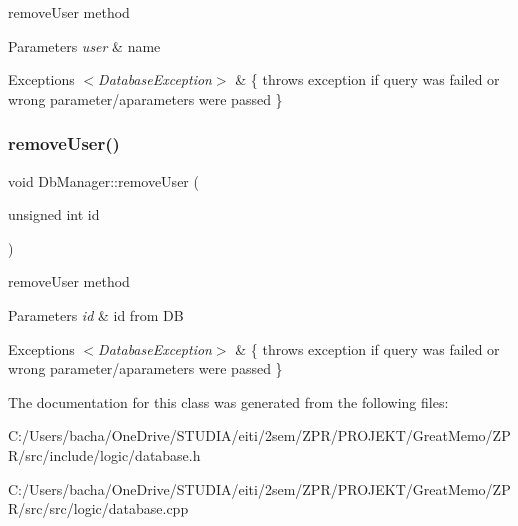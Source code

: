 remove\+User method 


\begin{DoxyParams}{Parameters}
{\em user} & name \\
\hline
\end{DoxyParams}

\begin{DoxyExceptions}{Exceptions}
{\em $<$\+Database\+Exception$>$} & \{ throws exception if query was failed or wrong parameter/aparameters were passed \} \\
\hline
\end{DoxyExceptions}
\mbox{\label{class_db_manager_ae9a11e4d2d53c2e4f63a835c43f2bab8}} 
\subsubsection{\texorpdfstring{remove\+User()}{removeUser()}\hspace{0.1cm}{\footnotesize\ttfamily [2/2]}}
{\footnotesize\ttfamily void Db\+Manager\+::remove\+User (\begin{DoxyParamCaption}\item[{unsigned int}]{id }\end{DoxyParamCaption})}



remove\+User method 


\begin{DoxyParams}{Parameters}
{\em id} & id from DB \\
\hline
\end{DoxyParams}

\begin{DoxyExceptions}{Exceptions}
{\em $<$\+Database\+Exception$>$} & \{ throws exception if query was failed or wrong parameter/aparameters were passed \} \\
\hline
\end{DoxyExceptions}


The documentation for this class was generated from the following files\+:\begin{DoxyCompactItemize}
\item 
C\+:/\+Users/bacha/\+One\+Drive/\+S\+T\+U\+D\+I\+A/eiti/2sem/\+Z\+P\+R/\+P\+R\+O\+J\+E\+K\+T/\+Great\+Memo/\+Z\+P\+R/src/include/logic/database.\+h\item 
C\+:/\+Users/bacha/\+One\+Drive/\+S\+T\+U\+D\+I\+A/eiti/2sem/\+Z\+P\+R/\+P\+R\+O\+J\+E\+K\+T/\+Great\+Memo/\+Z\+P\+R/src/src/logic/database.\+cpp\end{DoxyCompactItemize}
